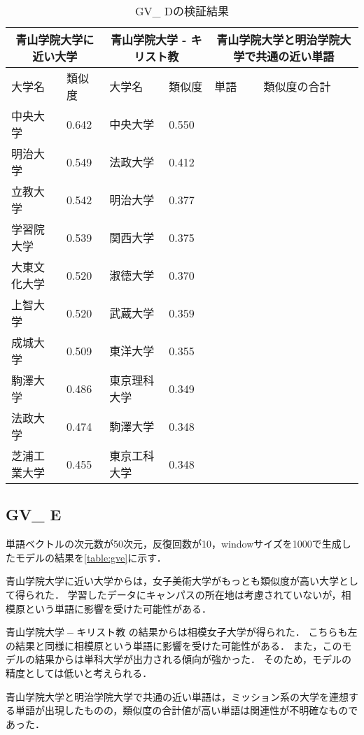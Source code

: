 \begin{table}[H]
\caption{GV\_ Dの検証結果}
\centering
\footnotesize
\begin{tabular}{ll|ll|ll}
\hline
\multicolumn{2}{c}{青山学院大学に近い大学} & \multicolumn{2}{c}{青山学院大学 - キリスト教} & \multicolumn{2}{c}{青山学院大学と明治学院大学で共通の近い単語}
\\ \hline
大学名 & 類似度 & 大学名 & 類似度 & 単語 & 類似度の合計
\\ \hline \hline
中央大学 & 0.642 & 中央大学 & 0.550 & & \\
明治大学 & 0.549 & 法政大学 & 0.412 & & \\
立教大学 & 0.542 & 明治大学 & 0.377 & & \\
学習院大学 & 0.539 & 関西大学 & 0.375 & & \\
大東文化大学 & 0.520 & 淑徳大学 & 0.370 & & \\
上智大学 & 0.520 & 武蔵大学 & 0.359 & & \\
成城大学 & 0.509 & 東洋大学 & 0.355 & & \\
駒澤大学 & 0.486 & 東京理科大学 & 0.349 & & \\
法政大学 & 0.474 & 駒澤大学 & 0.348 & & \\
芝浦工業大学 & 0.455 & 東京工科大学 & 0.348 & & \\ \hline
\end{tabular}
\label{table:gvd}
\end{table}

\subsection{GV\_ E}
単語ベクトルの次元数が50次元，反復回数が10，windowサイズを1000で生成したモデルの結果を\ref{table:gve}に示す．

青山学院大学に近い大学からは，女子美術大学がもっとも類似度が高い大学として得られた．
学習したデータにキャンパスの所在地は考慮されていないが，相模原という単語に影響を受けた可能性がある．

$ 青山学院大学 - キリスト教 $ の結果からは相模女子大学が得られた．
こちらも左の結果と同様に相模原という単語に影響を受けた可能性がある．
また，このモデルの結果からは単科大学が出力される傾向が強かった．
そのため，モデルの精度としては低いと考えられる．

青山学院大学と明治学院大学で共通の近い単語は，ミッション系の大学を連想する単語が出現したものの，類似度の合計値が高い単語は関連性が不明確なものであった．

